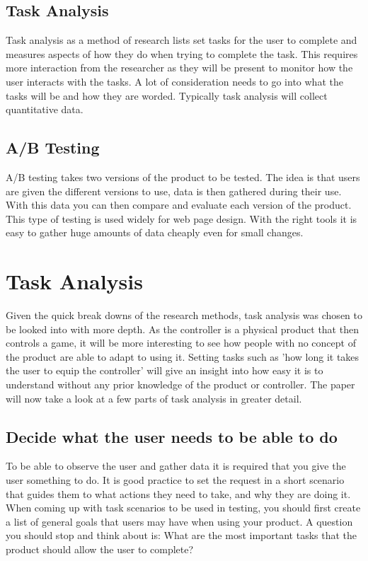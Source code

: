 \documentclass{scrartcl}
\begin{document}
	\subsection{Task Analysis}
		Task analysis as a method of research lists set tasks for the user to complete and measures aspects of how they do when trying to complete the task. This requires more interaction from the researcher as they will be present to monitor how the user interacts with the tasks\cite{diaper2003handbook}. A lot of consideration needs to go into what the tasks will be and how they are worded. Typically task analysis will collect quantitative data.
		
	\subsection{A/B Testing}
		A/B testing takes two versions of the product to be tested. The idea is that users are given the different versions to use, data is then gathered during their use. With this data you can then compare and evaluate each version of the product. This type of testing is used widely for web page design\cite{azevedo2018b}. With the right tools it is easy to gather huge amounts of data cheaply even for small changes. 
		
	\section{Task Analysis}
		Given the quick break downs of the research methods, task analysis was chosen to be looked into with more depth. As the controller is a physical product that then controls a game, it will be more interesting to see how people with no concept of the product are able to adapt to using it. Setting tasks such as 'how long it takes the user to equip the controller' will give an insight into how easy it is to understand without any prior knowledge of the product or controller. The paper will now take a look at a few parts of task analysis in greater detail.
		
	\subsection{Decide what the user needs to be able to do}
		To be able to observe the user and gather data it is required that you give the user something to do. It is good practice to set the request in a short scenario that guides them to what actions they need to take, and why they are doing it. When coming up with task scenarios to be used in testing, you should first create a list of general goals that users may have when using your product. A question you should stop and think about is: What are the most important tasks that the product should allow the user to complete?\cite{nielsen_norman_tognazzini_2018}
	
\end{document}
